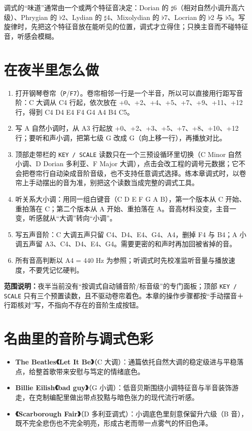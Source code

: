 调式的“味道”通常由一个或两个特征音决定：Dorian 的 \(\sharp\)6（相对自然小调升高六级）、Phrygian 的 \(\flat\)2、Lydian 的 \(\sharp\)4、Mixolydian 的 \(\flat\)7、Locrian 的 \(\flat\)2 与 \(\flat\)5。写旋律时，先把这个特征音放在能听见的位置，调式才立得住；只换主音而不碰特征音，听感会模糊。

\section{在夜半里怎么做}

\begin{enumerate}
  \item 打开钢琴卷帘（\texttt{P}/\texttt{F7}）。卷帘相邻一行是一个半音，所以可以直接用行距写音阶：C 大调从 C4 行起，依次放在 +0、+2、+4、+5、+7、+9、+11、+12 行，得到 C4 D4 E4 F4 G4 A4 B4 C5。
  \item 写 A 自然小调时，从 A3 行起放 +0、+2、+3、+5、+7、+8、+10、+12 行；要听和声小调，把第七级 G 改成 G\sharpsym（向上移一行），再播放对比。
  \item 顶部走带栏的 \texttt{KEY / SCALE} 读数只在一个三预设循环里切换（C Minor 自然小调、D Dorian 多利亚、F Major 大调），点击会改工程的调号元数据；它不会把卷帘行自动染成音阶音级，也不支持任意调式选择。练本章调式时，以卷帘上手动摆出的音为准，别把这个读数当成完整的调式工具。
  \item 听关系大小调：用同一组白键音（C D E F G A B），第一个版本从 C 开始、重拍落在 C；第二个版本从 A 开始、重拍落在 A。音高材料没变，主音一变，听感就从“大调”转向“小调”。
  \item 写五声音阶：C 大调五声只留 C4、D4、E4、G4、A4，删掉 F4 与 B4；A 小调五声留 A3、C4、D4、E4、G4。需要更密的和声时再加回被省掉的音。
  \item 所有音高判断以 A4 = 440 Hz 为参照；听调式时先校准监听音量与播放速度，不要凭记忆硬判。
\end{enumerate}


\textbf{范围说明：}夜半当前没有“按调式自动铺音阶/标音级”的专门面板；顶部 \texttt{KEY / SCALE} 只有三个预置读数，且不驱动卷帘着色。本章的操作步骤都按“手动摆音＋行距核对”写，不指向不存在的音阶生成按钮。

\section{名曲里的音阶与调式色彩}

\begin{itemize}
  \item \textbf{The Beatles《Let It Be》}（C 大调）：通篇依托自然大调的稳定级进与平稳落点，给整首歌带来安慰与笃定的情绪底色。
  \item \textbf{Billie Eilish《bad guy》}（G 小调）：低音贝斯围绕小调特征音与半音装饰游走，在克制编配里做出带点狡黠与暗色张力的现代流行听感。
  \item \textbf{《Scarborough Fair》}（D 多利亚调式）：小调底色里刻意保留升六级（B 音），既不完全悲伤也不完全明亮，形成古老而带一点雾气的怀旧色泽。
\end{itemize}


